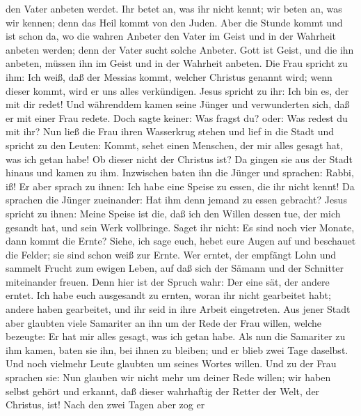 den Vater anbeten werdet.  Ihr betet an, was ihr nicht
kennt; wir beten an, was wir kennen; denn das Heil kommt von den Juden.
 Aber die Stunde kommt und ist schon da, wo die wahren
Anbeter den Vater im Geist und in der Wahrheit anbeten werden; denn der
Vater sucht solche Anbeter.  Gott ist Geist, und die ihn
anbeten, müssen ihn im Geist und in der Wahrheit anbeten.
 Die Frau spricht zu ihm: Ich weiß, daß der Messias
kommt, welcher Christus genannt wird; wenn dieser kommt, wird er uns
alles verkündigen.  Jesus spricht zu ihr: Ich bin es, der
mit dir redet!  Und währenddem kamen seine Jünger und
verwunderten sich, daß er mit einer Frau redete. Doch sagte keiner: Was
fragst du? oder: Was redest du mit ihr?  Nun ließ die
Frau ihren Wasserkrug stehen und lief in die Stadt und spricht zu den
Leuten:  Kommt, sehet einen Menschen, der mir alles
gesagt hat, was ich getan habe! Ob dieser nicht der Christus ist?
 Da gingen sie aus der Stadt hinaus und kamen zu ihm.
 Inzwischen baten ihn die Jünger und sprachen: Rabbi, iß!
 Er aber sprach zu ihnen: Ich habe eine Speise zu essen,
die ihr nicht kennt!  Da sprachen die Jünger zueinander:
Hat ihm denn jemand zu essen gebracht?  Jesus spricht zu
ihnen: Meine Speise ist die, daß ich den Willen dessen tue, der mich
gesandt hat, und sein Werk vollbringe.  Saget ihr nicht:
Es sind noch vier Monate, dann kommt die Ernte? Siehe, ich sage euch,
hebet eure Augen auf und beschauet die Felder; sie sind schon weiß zur
Ernte.  Wer erntet, der empfängt Lohn und sammelt Frucht
zum ewigen Leben, auf daß sich der Sämann und der Schnitter miteinander
freuen.  Denn hier ist der Spruch wahr: Der eine sät, der
andere erntet.  Ich habe euch ausgesandt zu ernten, woran
ihr nicht gearbeitet habt; andere haben gearbeitet, und ihr seid in ihre
Arbeit eingetreten.  Aus jener Stadt aber glaubten viele
Samariter an ihn um der Rede der Frau willen, welche bezeugte: Er hat
mir alles gesagt, was ich getan habe.  Als nun die
Samariter zu ihm kamen, baten sie ihn, bei ihnen zu bleiben; und er
blieb zwei Tage daselbst.  Und noch vielmehr Leute
glaubten um seines Wortes willen.  Und zu der Frau
sprachen sie: Nun glauben wir nicht mehr um deiner Rede willen; wir
haben selbst gehört und erkannt, daß dieser wahrhaftig der Retter der
Welt, der Christus, ist!  Nach den zwei Tagen aber zog er
